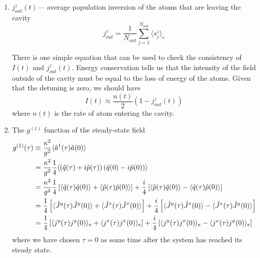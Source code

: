 \documentclass{article}
\begin{document}
\begin{enumerate}
    \item $j^z_{out}(t)$\---- average population inversion of the atoms that are leaving the cavity
        \begin{equation}
            j^z_{out} = \frac{1}{N_{out}} \sum_{j=1}^{N_{out}}\langle s_j^z\rangle_e
        \end{equation}
        
        There is one simple equation that can be used to check the consistency of $I(t)$ and $j^z_{out}(t)$. Energy conservation tells us that the intensity of the field outside of the cavity must be equal to the loss of energy of the atoms. Given that the detuning is zero, we should have
        \begin{equation}
            \label{energyConservation}
            I(t) \approx \frac{n(t)}{2}\left(1-j^z_{out}(t)\right)
        \end{equation}
        where $n(t)$ is the rate of atom entering the cavity.
        
    \item The $g^{(1)}$ function of the steady-state field
        \begin{align}
                \label{g1}
            \notag g^{(1)}(\tau) &\equiv \frac{\kappa^2}{g^2}\langle \hat{a}^\dagger(\tau) \hat{a}(0) \rangle\\
            \notag   &= \frac{\kappa^2}{g^2}\frac{1}{4} \langle \left( \hat{q}(\tau)+i\hat{p}(\tau)\right)\left(\hat{q}(0)-i\hat{p}(0) \right)\rangle\\
            \notag   &= \frac{\kappa^2}{g^2}\frac{1}{4} \left[\langle\hat{q}(\tau)\hat{q}(0)\rangle+\langle\hat{p}(\tau)\hat{p}(0)\rangle\right]+\frac{i}{4}\left[\langle\hat{p}(\tau)\hat{q}(0)\rangle-\langle\hat{q}(\tau)\hat{p}(0)\rangle\right]\\
            \notag   &= \frac{1}{4} \left[\langle\hat{J}^y(\tau)\hat{J}^y(0)\rangle+\langle\hat{J}^x(\tau)\hat{J}^x(0)\rangle\right]+\frac{i}{4}\left[\langle\hat{J}^y(\tau)\hat{J}^x(0)\rangle-\langle\hat{J}^x(\tau)\hat{J}^y(0)\rangle\right]\\
                     &= \frac{1}{4} \left[\langle j^y(\tau)j^y(0)\rangle_e+\langle j^x(\tau)j^x(0)\rangle_e\right]+\frac{i}{4}\left[\langle j^y(\tau)j^x(0)\rangle_e-\langle j^x(\tau)j^y(0)\rangle_e\right]
        \end{align}
        where we have chosen $\tau = 0$ as some time after the system has reached its steady state.
        

\end{enumerate}
\end{document}

